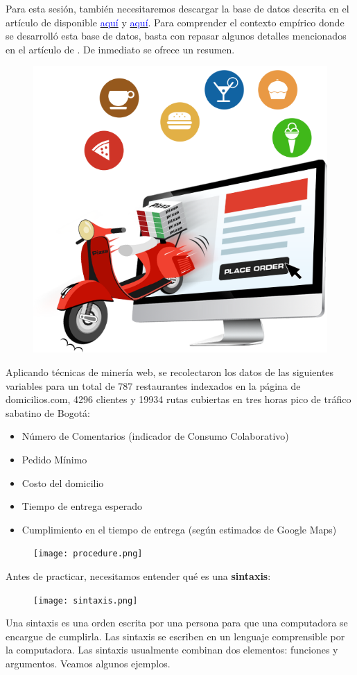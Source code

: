 \documentclass[aspectratio=169]{beamer}
\begin{document}
\begin{frame}
Para esta sesión, también necesitaremos descargar la base de datos descrita en el artículo de \citeauthor{Segura2019} \citeyear{Segura2019} disponible \href{https://doi.org/10.1016/j.dib.2019.104007}{\textcolor{blue}{aquí}} y \href{https://data.mendeley.com/datasets/m9z9hw4nsc/1}{\textcolor{blue}{aquí}}. Para comprender el contexto empírico donde se desarrolló esta base de datos, basta con repasar algunos detalles mencionados en el artículo de \citeauthor{Correa2019} \citeyear{Correa2019}. De inmediato se ofrece un resumen.\\
\begin{figure}
\includegraphics[width=.3\textwidth]{ofos}
\end{figure}
\end{frame}

\begin{frame}
Aplicando técnicas de minería web, se recolectaron los datos de las siguientes variables para un total de 787 restaurantes indexados en la página de domicilios.com, 4296 clientes y 19934 rutas cubiertas en tres horas pico de tráfico sabatino de Bogotá:
\vspace{0.5cm}
\begin{itemize}
    \item Número de Comentarios (indicador de Consumo Colaborativo)
    \item Pedido Mínimo
    \item Costo del domicilio
    \item Tiempo de entrega esperado
    \item Cumplimiento en el tiempo de entrega (según estimados de Google Maps) 
\end{itemize}
\end{frame}

\begin{frame}
\begin{figure}
\centering
\texttt{[image: procedure.png]}
\end{figure}
\end{frame}

\begin{frame}
Antes de practicar, necesitamos entender qué es una \textbf{sintaxis}:
\begin{figure}
\centering
\texttt{[image: sintaxis.png]}
\end{figure}
Una sintaxis es una orden escrita por una persona para que una computadora se encargue de cumplirla. Las sintaxis se escriben en un lenguaje comprensible por la computadora. Las sintaxis usualmente combinan dos elementos: funciones y argumentos. Veamos algunos ejemplos.
\end{frame}
\end{document}
